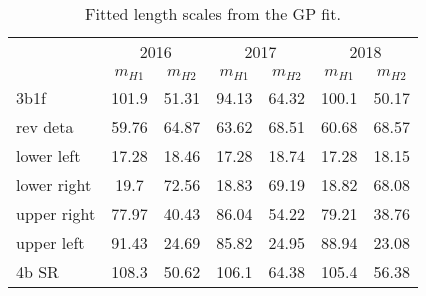 \begin{table}
\centering
\caption{Fitted length scales from the GP fit.}
\label{tab:len-scales}
\begin{tabular}{lcccccc}
\toprule
{} & \multicolumn{2}{c}{2016} & \multicolumn{2}{c}{2017} & \multicolumn{2}{c}{2018} \\
{} & $m_{H1}$ & $m_{H2}$ & $m_{H1}$ & $m_{H2}$ & $m_{H1}$ & $m_{H2}$ \\
\midrule
3b1f        &    101.9 &    51.31 &    94.13 &    64.32 &    100.1 &    50.17 \\
rev deta    &    59.76 &    64.87 &    63.62 &    68.51 &    60.68 &    68.57 \\
lower left  &    17.28 &    18.46 &    17.28 &    18.74 &    17.28 &    18.15 \\
lower right &     19.7 &    72.56 &    18.83 &    69.19 &    18.82 &    68.08 \\
upper right &    77.97 &    40.43 &    86.04 &    54.22 &    79.21 &    38.76 \\
upper left  &    91.43 &    24.69 &    85.82 &    24.95 &    88.94 &    23.08 \\
4b SR       &    108.3 &    50.62 &    106.1 &    64.38 &    105.4 &    56.38 \\
\bottomrule
\end{tabular}
\end{table}
